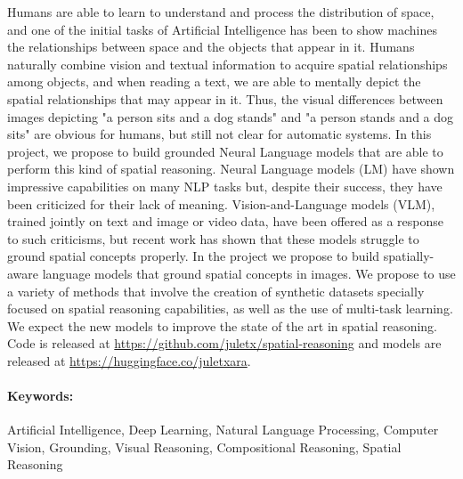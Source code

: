 Humans are able to learn to understand and process the distribution of space, and one of the initial tasks of Artificial Intelligence has been to show machines the relationships between space and the objects that appear in it. Humans naturally combine vision and textual information to acquire spatial relationships among objects, and when reading a text, we are able to mentally depict the spatial relationships that may appear in it. Thus, the visual differences between images depicting "a person sits and a dog stands" and "a person stands and a dog sits" are obvious for humans, but still not clear for automatic systems. In this project, we propose to build grounded Neural Language models that are able to perform this kind of spatial reasoning. Neural Language models (LM) have shown impressive capabilities on many NLP tasks but, despite their success, they have been criticized for their lack of meaning. Vision-and-Language models (VLM), trained jointly on text and image or video data, have been offered as a response to such criticisms, but recent work has shown that these models struggle to ground spatial concepts properly. In the project we propose to build spatially-aware language models that ground spatial concepts in images. We propose to use a variety of methods that involve the creation of synthetic datasets specially focused on spatial reasoning capabilities, as well as the use of multi-task learning. We expect the new models to improve the state of the art in spatial reasoning. Code is released at \url{https://github.com/juletx/spatial-reasoning} and models are released at \url{https://huggingface.co/juletxara}.

\paragraph{Keywords:} Artificial Intelligence, Deep Learning, Natural Language Processing, Computer Vision, Grounding, Visual Reasoning, Compositional Reasoning, Spatial Reasoning